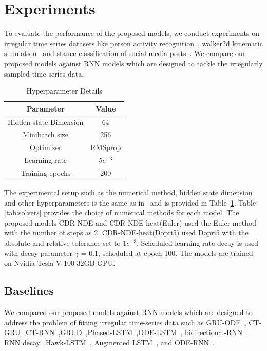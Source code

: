 \documentclass{article} %
\begin{document}
\section{Experiments}
To evaluate the performance of the proposed models, we conduct experiments on irregular time series datasets like person activity recognition~\citep{asuncion2007uci}, walker2d kinematic simulation~\citep{lechner2020learning} and stance classification of social media posts~\citep{RumourEval_2019_dataset}. We compare our proposed models against RNN models which are designed to tackle the irregularly sampled time-series data.
\begin{table}
    \centering
    \caption{Hyperparameter Details}
    \begin{tabular}{|c|c|}
        \hline
            Parameter & Value  \\ 
        \hline
           Hidden state Dimension & 64 \\
            Minibatch size & 256 \\
            Optimizer & RMSprop \\
            Learning rate & $5e^{-3}$ \\
            Training epochs & 200 \\
        \hline
    \end{tabular}
    \label{tab:my_label}
\end{table} 
The experimental setup such as  the numerical method, hidden state dimension and other hyperparameters is the same as in~\citep{lechner2020learning} and is provided in Table~\ref{tab:my_label}. Table \ref{tab:solvers} provides the choice of numerical methods for each model. The proposed models CDR-NDE and CDR-NDE-heat(Euler) used the Euler method with the number of steps as 2.
CDR-NDE-heat(Dopri5) used Dopri5  with the absolute and relative tolerance set to $1e^{-3}$. Scheduled learning rate decay is used with decay parameter $\gamma$ = 0.1, scheduled at epoch 100. The models are trained on Nvidia Tesla V-100 32GB GPU. 

\subsection{Baselines}
We compared our proposed models against RNN models which are designed to address the problem of fitting irregular time-series data such as
GRU-ODE~\citep{de2019gru}, CT-GRU~\citep{ctgru},CT-RNN~\citep{ctrnn},GRUD~\citep{grud},Phased-LSTM~\citep{neil2016phased},ODE-LSTM~\citep{lechner2020learning}, bidirectional-RNN~\citep{schuster1997bidirectional}, RNN decay~\citep{rubanova2019latent},Hawk-LSTM~\citep{hawk}, Augmented LSTM~\citep{lechner2020learning}, and ODE-RNN~\citep{rubanova2019latent}.
\end{document}
